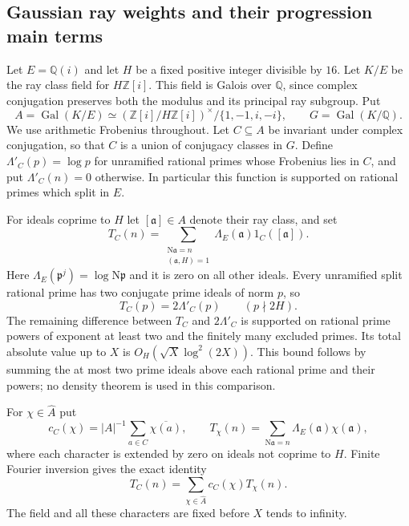 \documentclass[11pt]{article}
\theoremstyle{definition}
\theoremstyle{remark}
\newcommand{\Q}{\mathbb Q}
\newcommand{\Z}{\mathbb Z}
\begin{document}
\subsection{Gaussian ray weights and their progression main terms}
\label{subsec:gaussian-progression-mainterms}

Let $E=\Q(i)$ and let $H$ be a fixed positive integer divisible by $16$.
Let $K/E$ be the ray class field for $H\Z[i]$.  This field is Galois over
$\Q$, since complex conjugation preserves both the modulus and its
principal ray subgroup.  Put
\[
 A=\operatorname{Gal}(K/E)
   \simeq (\Z[i]/H\Z[i])^\times/\{1,-1,i,-i\},
 \qquad G=\operatorname{Gal}(K/\Q).
\]
We use arithmetic Frobenius throughout.  Let $C\subseteq A$ be invariant
under complex conjugation, so that $C$ is a union of conjugacy classes in
$G$.  Define $\Lambda'_C(p)=\log p$ for unramified rational primes whose
Frobenius lies in $C$, and put $\Lambda'_C(n)=0$ otherwise.  In particular
this function is supported on rational primes which split in $E$.

For ideals coprime to $H$ let $[\mathfrak a]\in A$ denote their ray class,
and set
\[
 T_C(n)=\sum_{\substack{\mathrm N\mathfrak a=n\\(\mathfrak a,H)=1}}
       \Lambda_E(\mathfrak a)1_C([\mathfrak a]).
\]
Here $\Lambda_E(\mathfrak p^j)=\log\mathrm N\mathfrak p$ and it is zero
on all other ideals.  Every unramified split rational prime has two
conjugate prime ideals of norm $p$, so
\begin{equation}\label{eq:gaussian-ray-prime-factor}
 T_C(p)=2\Lambda'_C(p)\qquad(p\nmid2H).
\end{equation}
The remaining difference between $T_C$ and $2\Lambda'_C$ is supported on
rational prime powers of exponent at least two and the finitely many
excluded primes.  Its total absolute value up to $X$ is
$O_H(\sqrt X\log^2(2X))$.  This bound follows by summing the at most two
prime ideals above each rational prime and their powers; no density
theorem is used in this comparison.

For $\chi\in\widehat A$ put
\[
 c_C(\chi)=|A|^{-1}\sum_{a\in C}\overline{\chi(a)},\qquad
 T_\chi(n)=\sum_{\mathrm N\mathfrak a=n}
                  \Lambda_E(\mathfrak a)\chi(\mathfrak a),
\]
where each character is extended by zero on ideals not coprime to $H$.
Finite Fourier inversion gives the exact identity
\begin{equation}\label{eq:gaussian-ray-fourier}
                 T_C(n)=\sum_{\chi\in\widehat A}c_C(\chi)T_\chi(n).
\end{equation}
The field and all these characters are fixed before $X$ tends to infinity.
\end{document}

